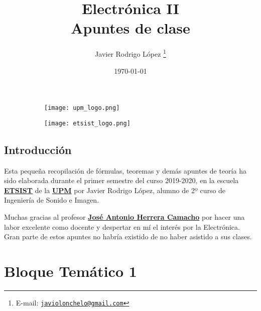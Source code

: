 \documentclass[a4paper]{book}
\title{\Huge Electrónica II\\
\Large Apuntes de clase}
\author{Javier Rodrigo López \thanks{E-mail: \href{mailto:javiolonchelo@gmail.com}{\texttt{javiolonchelo@gmail.com}}}}
\date{\today}
\numberwithin{figure}{chapter}
\numberwithin{equation}{chapter}
\begin{document}
\setlength{\wpYoffset}{-5 cm}


\maketitle







 \begin{figure}[t!]
 \centering
 \begin{subfigure}[b]{0.65\linewidth}
   \texttt{[image: upm\_logo.png]}
 \end{subfigure}
 \begin{subfigure}[b]{0.25\linewidth}
   \texttt{[image: etsist\_logo.png]}
 \end{subfigure}
\end{figure}


\newpage

\setlength{\parskip}{0.5em}

\section*{Introducción}
Esta pequeña recopilación de fórmulas, teoremas y demás apuntes de teoría ha sido elaborada durante el primer semestre del curso 2019-2020, en la escuela \href{https://www.etsist.upm.es/}{\textbf{ETSIST}} de la \href{http://www.upm.es/}{\textbf{UPM}} por Javier Rodrigo López, alumno de 2º curso de Ingeniería de Sonido e Imagen.

Muchas gracias al profesor \href{https://www.euitt.upm.es/escuela/directorio?departamento=DTE&idTrabajador=c0874849914b0380a54a53f80d4d60f1}{\textbf{José Antonio Herrera Camacho}} por hacer una labor excelente como docente y despertar en mí el interés por la Electrónica. Gran parte de estos apuntes no habría existido de no haber asistido a sus clases.
\newpage

\setlength{\parskip}{0em}
\tableofcontents 
\setlength{\parskip}{0.5em}


\chapter{Bloque Temático 1}
\end{document}
